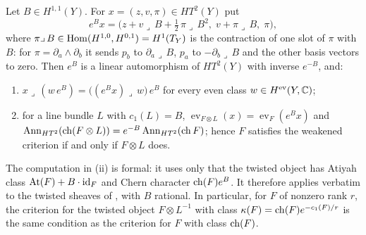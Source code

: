 \begin{lemma}\label{lem:bfield}
Let $B\in H^{1,1}(Y)$. For $x=(z,v,\pi)\in HT^{2}(Y)$ put
\begin{equation}\label{eq:bfield}
  e^{B}x=\bigl(z+v\lrcorner\,B+\tfrac12\,\pi\lrcorner\,B^{2},\;
  v+\pi\lrcorner\,B,\;\pi\bigr),
\end{equation}
where $\pi\lrcorner\,B\in\operatorname{Hom}(H^{1,0},H^{0,1})=H^{1}(T_{Y})$ is the contraction
of one slot of $\pi$ with $B$: for $\pi=\partial_{a}\wedge\partial_{b}$ it sends
$p_{b}$ to $\partial_{a}\lrcorner\,B$, $p_{a}$ to $-\partial_{b}\lrcorner\,B$
and the other basis vectors to zero. Then $e^{B}$ is a linear automorphism of
$HT^{2}(Y)$ with inverse $e^{-B}$, and:
\begin{enumerate}[label=\textup{(\roman*)},nosep]
\item $x\lrcorner\,(w\,e^{B})=\bigl((e^{B}x)\lrcorner\,w\bigr)\,e^{B}$ for
  every even class $w\in H^{\mathrm{ev}}(Y,\mathbb{C})$;
\item for a line bundle $L$ with $c_{1}(L)=B$,
  $\operatorname{ev}_{F\otimes L}(x)=\operatorname{ev}_{F}(e^{B}x)$ and
  $\operatorname{Ann}_{HT^{2}}(\operatorname{ch}(F\otimes L))=e^{-B}\operatorname{Ann}_{HT^{2}}(\operatorname{ch} F)$; hence $F$
  satisfies the weakened criterion if and only if $F\otimes L$ does.
\end{enumerate}
The computation in (ii) is formal: it uses only that the twisted object has
Atiyah class $\mathrm{At}(F)+B\cdot\operatorname{id}_{F}$ and Chern character
$\operatorname{ch}(F)e^{B}$. It therefore applies verbatim to the twisted sheaves of
\cite[Section 2]{Mar25b}, with $B$ rational. In particular, for $F$ of
nonzero rank $r$, the criterion for the twisted object $F\otimes L^{-1}$ with class
$\kappa(F)=\operatorname{ch}(F)e^{-c_{1}(F)/r}$ is the same condition as the criterion for
$F$ with class $\operatorname{ch}(F)$.
\end{lemma}

